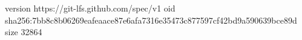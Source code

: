 version https://git-lfs.github.com/spec/v1
oid sha256:7bb8c8b06269eafeaace87e6afa7316e35473c877597cf42bd9a590639bce89d
size 32864
